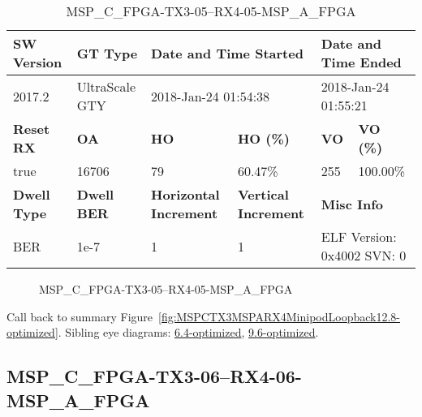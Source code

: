 \begin{table}[h]
\centering
\caption{MSP\_C\_FPGA-TX3-05--RX4-05-MSP\_A\_FPGA}
\label{tab:MSPCFPGATX305RX405MSPAFPGA12.8-optimized}
\begin{tabular}{@{}|l|l|l|l|l|l|@{}}
\toprule
\textbf{SW Version}                & \textbf{GT Type}   & \multicolumn{2}{l|}{\textbf{Date and Time Started}}            & \multicolumn{2}{l|}{\textbf{Date and Time Ended}}        \\ \midrule
2017.2                       & UltraScale GTY          & \multicolumn{2}{l|}{2018-Jan-24 01:54:38}                   & \multicolumn{2}{l|}{2018-Jan-24 01:55:21}               \\ \midrule
\textbf{Reset RX}                  & \textbf{OA} & \textbf{HO}   & \textbf{HO (\%)} & \textbf{VO} & \textbf{VO (\%)} \\ \midrule
true & 16706        & 79          & 60.47\%        & 255        & 100.00\%       \\ \midrule
\textbf{Dwell Type}                & \textbf{Dwell BER} & \textbf{Horizontal Increment} & \textbf{Vertical Increment}    & \multicolumn{2}{l|}{\textbf{Misc Info}}                  \\ \midrule
BER                            & 1e-7        & 1        & 1           & \multicolumn{2}{l|}{ELF Version: 0x4002 SVN: 0}                         \\ \bottomrule
\end{tabular}
\end{table}

\begin{figure}[h]
\caption{MSP\_C\_FPGA-TX3-05--RX4-05-MSP\_A\_FPGA} \label{fig:MSPCFPGATX305RX405MSPAFPGA12.8-optimized}
\end{figure}

Call back to summary Figure~\ref{fig:MSPCTX3MSPARX4MinipodLoopback12.8-optimized}.
Sibling eye diagrams: \hyperref[sec:MSPCFPGATX305RX405MSPAFPGA6.4-optimized]{6.4-optimized}, \hyperref[sec:MSPCFPGATX305RX405MSPAFPGA9.6-optimized]{9.6-optimized}.

\clearpage
\newpage


\subsection{MSP\_C\_FPGA-TX3-06--RX4-06-MSP\_A\_FPGA}\label{sec:MSPCFPGATX306RX406MSPAFPGA12.8-optimized}

